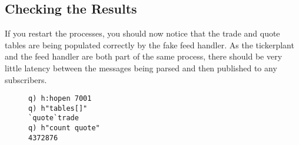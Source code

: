 \subsection{Checking the Results}

If you restart the processes, you should now notice that the trade and quote tables are being populated correctly
by the fake feed handler. As the tickerplant and the feed handler are both part of the same process, there should
be very little latency between the messages being parsed and then published to any subscribers.

\begin{figure}[h]
\begin{lstlisting}
q) h:hopen 7001
q) h"tables[]"
`quote`trade
q) h"count quote"
4372876
\end{lstlisting}
\caption{}
\end{figure}